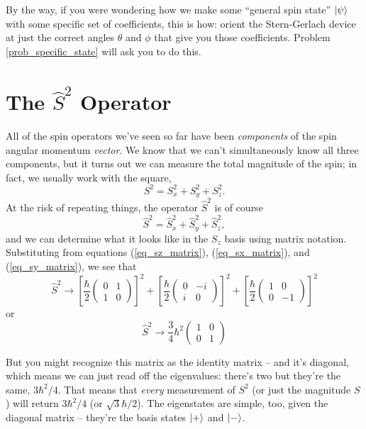 By the way, if you were wondering how we make some ``general spin state'' $| \psi \rangle$ with some specific set of coefficients, this is how:  orient the Stern-Gerlach device at just the correct angles $\theta$ and $\phi$ that give you those coefficients.  Problem \ref{prob_specific_state} will ask you to do this.


\section{The $\hat{S}^2$ Operator}

All of the spin operators we've seen so far have been \emph{components} of the spin angular momentum \emph{vector}.  We know that we can't simultaneously know all three components, but it turns out we can measure the total magnitude of the spin; in fact, we usually work with the square,
\begin{equation}
S^2 = S_x^2 + S_y^2 + S_z^2.
\end{equation}
At the risk of repeating things, the operator $\hat{S}^2$ is of course
\begin{equation}
\hat{S}^2 = \hat{S}_x^2 + \hat{S}_y^2 + \hat{S}_z^2,
\end{equation}
and we can determine what it looks like in the $S_z$ basis using matrix notation.  Substituting from equations (\ref{eq_sz_matrix}), (\ref{eq_sx_matrix}), and (\ref{eq_sy_matrix}), we see that
\begin{equation}
\hat{S}^2 \to \left[ \frac{\hbar}{2} \begin{pmatrix} 0 & 1 \\ 1 & 0 \end{pmatrix} \right]^2 + 
\left[ \frac{\hbar}{2} \begin{pmatrix} 0 & -i \\ i & 0 \end{pmatrix} \right]^2 + 
\left[ \frac{\hbar}{2} \begin{pmatrix} 1 & 0 \\ 0 & -1 \end{pmatrix} \right]^2
\end{equation}
or
\begin{equation}
\hat{S}^2 \to \frac{3}{4} \hbar^2 \begin{pmatrix} 1 & 0 \\ 0 & 1 \end{pmatrix} 
\end{equation}

But you might recognize this matrix as the identity matrix -- and it's diagonal, which means we can just read off the eigenvalues:  there's two but they're the same, $3\hbar^2/4$.  That means that \emph{every} measurement of $S^2$ (or just the magnitude $S$) will return $3\hbar^2/4$ (or $\sqrt{3} \hbar /2$).  The eigenstates are simple, too, given the diagonal matrix -- they're the basis states $| + \rangle$ and $| - \rangle$.

